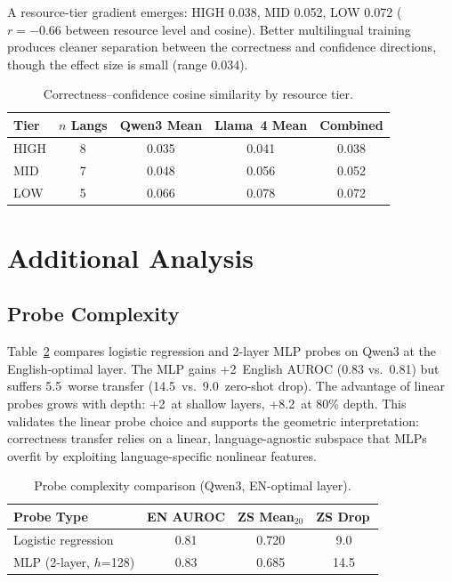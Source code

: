 \documentclass[11pt,a4paper]{article}
\newcommand{\pp}{\,\text{pp}}
\begin{document}
A resource-tier gradient emerges: HIGH 0.038, MID 0.052, LOW 0.072 ($r = -0.66$ between resource level and cosine). Better multilingual training produces cleaner separation between the correctness and confidence directions, though the effect size is small (range 0.034).

\begin{table}[t]
\centering
\caption{Correctness--confidence cosine similarity by resource tier.}
\label{tab:ortho}
\small
\begin{tabular}{lcccc}
\toprule
Tier & $n$ Langs & Qwen3 Mean & Llama~4 Mean & Combined \\
\midrule
HIGH & 8 & 0.035 & 0.041 & 0.038 \\
MID  & 7 & 0.048 & 0.056 & 0.052 \\
LOW  & 5 & 0.066 & 0.078 & 0.072 \\
\bottomrule
\end{tabular}
\end{table}

\section{Additional Analysis}
\label{sec:additional}

\subsection{Probe Complexity}
\label{sec:probe_complexity}

Table~\ref{tab:probe_complexity} compares logistic regression and 2-layer MLP probes on Qwen3 at the English-optimal layer. The MLP gains +2\pp{} English AUROC (0.83 vs.\ 0.81) but suffers 5.5\pp{} worse transfer (14.5\pp{} vs.\ 9.0\pp{} zero-shot drop). The advantage of linear probes grows with depth: +2\pp{} at shallow layers, +8.2\pp{} at 80\% depth. This validates the linear probe choice and supports the geometric interpretation: correctness transfer relies on a linear, language-agnostic subspace that MLPs overfit by exploiting language-specific nonlinear features.

\begin{table}[h]
\centering
\caption{Probe complexity comparison (Qwen3, EN-optimal layer).}
\label{tab:probe_complexity}
\small
\begin{tabular}{lccc}
\toprule
Probe Type & EN AUROC & ZS Mean$_{20}$ & ZS Drop\pp \\
\midrule
Logistic regression   & 0.81 & 0.720 & 9.0 \\
MLP (2-layer, $h$=128) & 0.83 & 0.685 & 14.5 \\
\bottomrule
\end{tabular}
\end{table}
\end{document}
